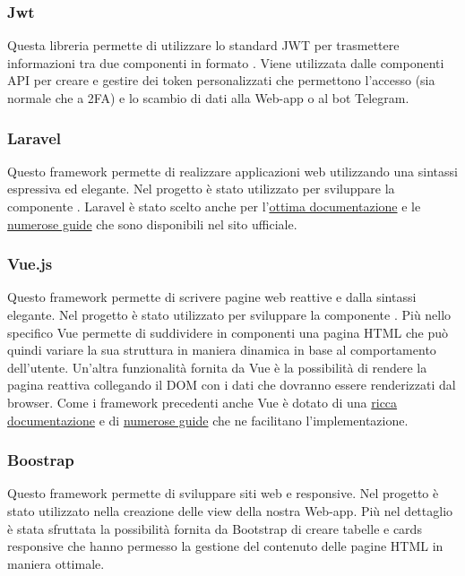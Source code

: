 		\subsubsection{Jwt}
			Questa libreria permette di utilizzare lo standard JWT per trasmettere informazioni tra due componenti in formato . Viene utilizzata dalle componenti API per creare e gestire dei token personalizzati che permettono l'accesso (sia normale che a 2FA) e lo scambio di dati alla Web-app o al bot Telegram.
		\subsubsection{Laravel}
			Questo framework permette di realizzare applicazioni web utilizzando una sintassi espressiva ed elegante. Nel progetto è stato utilizzato per sviluppare la componente . Laravel è stato scelto anche per l'\href{https://laravel.com/docs/7.x}{ottima documentazione} e le \href{https://laravel.com/docs/7.x/routing}{numerose guide} che sono disponibili nel sito ufficiale.
		\subsubsection{Vue.js}
			Questo framework permette di scrivere pagine web reattive e dalla sintassi elegante. Nel progetto è stato utilizzato per sviluppare la componente . Più nello specifico Vue permette di suddividere in componenti una pagina HTML che può quindi variare la sua struttura in maniera dinamica in base al comportamento dell'utente. Un'altra funzionalità fornita da Vue è la possibilità di rendere la pagina reattiva collegando il DOM con i dati che dovranno essere renderizzati dal browser.
			Come i framework precedenti anche Vue è dotato di una \href{https://vuejs.org/v2/api/}{ricca documentazione} e di \href{https://vuejs.org/v2/guide/index.html}{numerose guide} che ne facilitano l'implementazione. 
		\subsubsection{Boostrap}
			Questo framework permette di sviluppare siti web e  responsive. Nel progetto è stato utilizzato nella creazione delle view della nostra Web-app.
			Più nel dettaglio è stata sfruttata la possibilità fornita da Bootstrap di creare tabelle e cards responsive che hanno permesso la gestione del contenuto delle pagine HTML in maniera ottimale.	
